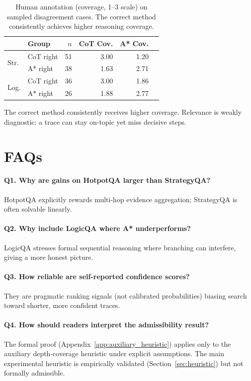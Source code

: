 \documentclass[11pt]{article}
\begin{document}
\begin{table}[h]
\centering
\small
\setlength{\tabcolsep}{3pt}
\begin{tabular}{llrrrr}
\toprule
& Group & $n$ & CoT Cov. & A* Cov. \\
\midrule
\multirow{2}{*}{Str.} & CoT right & 51 & 3.00 & 1.20 \\
& A* right & 38 & 1.63 & 2.71 \\
\midrule
\multirow{2}{*}{Log.} & CoT right & 36 & 3.00 & 1.86 \\
& A* right & 26 & 1.88 & 2.77 \\
\bottomrule
\end{tabular}
\caption{Human annotation (coverage, 1--3 scale) on sampled disagreement cases. The correct method consistently achieves higher reasoning coverage.}
\label{tab:disagreement-human-eval}
\end{table}

The correct method consistently receives higher coverage. Relevance is weakly diagnostic: a trace can stay on-topic yet miss decisive steps.

\section{FAQs}
\label{app:faqs}

\paragraph{Q1. Why are gains on HotpotQA larger than StrategyQA?}
HotpotQA explicitly rewards multi-hop evidence aggregation; StrategyQA is often solvable linearly.

\paragraph{Q2. Why include LogicQA where A* underperforms?}
LogicQA stresses formal sequential reasoning where branching can interfere, giving a more honest picture.

\paragraph{Q3. How reliable are self-reported confidence scores?}
They are pragmatic ranking signals (not calibrated probabilities) biasing search toward shorter, more confident traces.

\paragraph{Q4. How should readers interpret the admissibility result?}
The formal proof (Appendix~\ref{app:auxiliary_heuristic}) applies only to the auxiliary depth-coverage heuristic under explicit assumptions. The main experimental heuristic is empirically validated (Section~\ref{sec:heuristic}) but not formally admissible.
\end{document}
